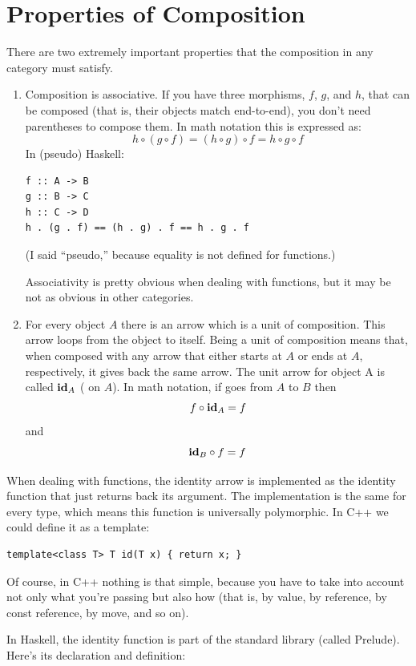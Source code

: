 \section{Properties of Composition}\label{properties-of-composition}

There are two extremely important properties that the composition in any
category must satisfy.

\begin{enumerate}
\item
Composition is associative. If you have three morphisms, $f$, $g$, and $h$,
that can be composed (that is, their objects match end-to-end), you
don't need parentheses to compose them. In math notation this is
expressed as:
\[h\circ{}(g\circ{}f) = (h\circ{}g)\circ{}f = h\circ{}g\circ{}f\]
In (pseudo) Haskell:

\begin{Verbatim}
f :: A -> B
g :: B -> C
h :: C -> D
h . (g . f) == (h . g) . f == h . g . f
\end{Verbatim}
(I said ``pseudo,'' because equality is not defined for functions.)

Associativity is pretty obvious when dealing with functions, but it may
be not as obvious in other categories.

\item
For every object $A$ there is an arrow which is a unit of composition.
This arrow loops from the object to itself. Being a unit of composition
means that, when composed with any arrow that either starts at $A$ or ends
at $A$, respectively, it gives back the same arrow. The unit arrow for
object A is called $\idarrow[A]$ ( on $A$). In math
notation, if  goes from $A$ to $B$ then
\[f \circ \idarrow[A] = f\]
and
\[\idarrow[B] \circ f = f\]
\end{enumerate}
When dealing with functions, the identity arrow is implemented as the
identity function that just returns back its argument. The
implementation is the same for every type, which means this function is
universally polymorphic. In C++ we could define it as a template:

\begin{Verbatim}
template<class T> T id(T x) { return x; }
\end{Verbatim}
Of course, in C++ nothing is that simple, because you have to take into
account not only what you're passing but also how (that is, by value, by
reference, by const reference, by move, and so on).

In Haskell, the identity function is part of the standard library
(called Prelude). Here's its declaration and definition:

